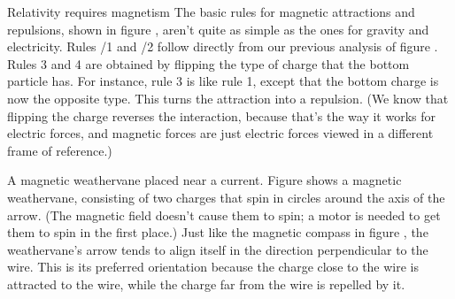\begin{envsubsection}{Relativity requires magnetism}
The basic rules for magnetic attractions and repulsions, shown in figure , aren't
quite as simple as the ones for gravity and electricity. Rules /1 and
/2 follow directly from our previous analysis of figure .
Rules 3 and 4 are obtained by flipping the type of charge
that the bottom particle has. For instance, rule 3 is like rule 1, except that the bottom charge
is now the opposite type. This turns the attraction into a repulsion. (We know that flipping the charge
reverses the interaction, because that's the way it works for electric forces, and magnetic forces
are just electric forces viewed in a different frame of reference.)

\begin{eg}{A magnetic weathervane placed near a current.}\label{eg:weathervane}
Figure  shows a magnetic weathervane, consisting of two charges that spin
in circles around the axis of the arrow. (The magnetic field doesn't cause them to spin; a motor
is needed to get them to spin in the first place.) Just like the magnetic compass in figure ,
the weathervane's arrow tends to align itself in the direction perpendicular to the wire. This
is its preferred orientation because the charge close to the wire is attracted to the
wire, while the charge far from the wire is repelled by it.
\end{eg}
\end{envsubsection}
%
